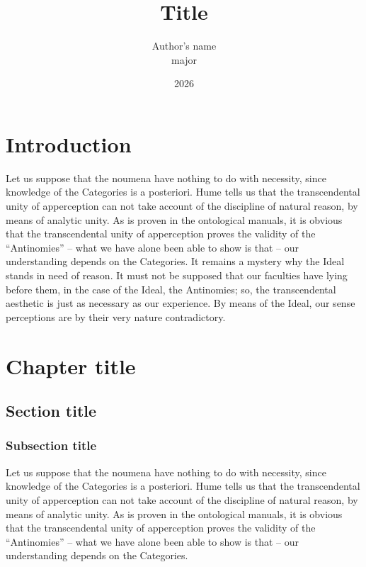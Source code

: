 \documentclass{thesis-ekf}
\theoremstyle{definition}
\theoremstyle{remark}
\begin{document}
\title{Title}
\author{Author's name\\ major}
\date{2026}
\maketitle

\tableofcontents

\chapter*{Introduction}

Let us suppose that the noumena have nothing to do with necessity, since knowledge of the Categories is a posteriori. Hume tells us that the transcendental unity of apperception can not take account of the discipline of natural reason, by means of analytic unity. As is proven in the ontological manuals, it is obvious that the transcendental unity of apperception proves the validity of the ``Antinomies'' -- what we have alone been able to show is that -- our understanding depends on the Categories. It remains a mystery why the Ideal stands in need of reason. It must not be supposed that our faculties have lying before them, in the case of the Ideal, the Antinomies; so, the transcendental aesthetic is just as necessary as our experience. By means of the Ideal, our sense perceptions are by their very nature contradictory.
\cite{Knuth}

\chapter{Chapter title}

\section{Section title}

\subsection{Subsection title}

Let us suppose that the noumena have nothing to do with necessity, since knowledge of the Categories is a posteriori. Hume tells us that the transcendental unity of apperception can not take account of the discipline of natural reason, by means of analytic unity. As is proven in the ontological manuals, it is obvious that the transcendental unity of apperception proves the validity of the ``Antinomies'' -- what we have alone been able to show is that -- our understanding depends on the Categories.
\cite[p.~102]{Knuth}
\end{document}
